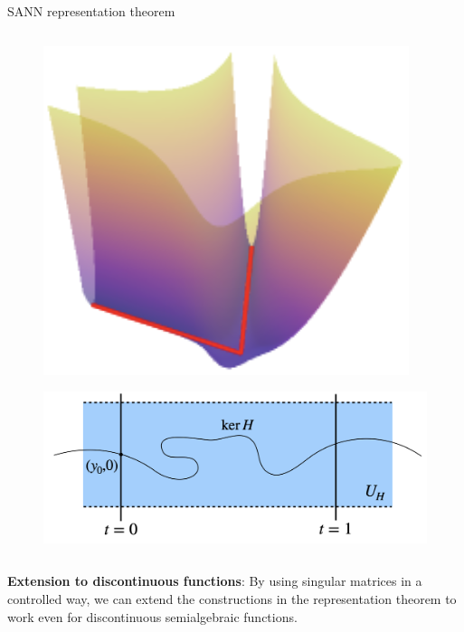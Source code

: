 \documentclass[final]{beamer}
\newlength{\lrcolwidth}
\begin{document}
\begin{frame}[t]
\begin{columns}[t]
\begin{column}{\lrcolwidth}
\begin{block}{SANN representation theorem}
\begin{columns}[t]
      \begin{column}{0.19\textwidth}
        \vspace{2cm}
        \begin{figure}[t!]
          \centering
          \vspace{-3cm}
          \includegraphics[width=0.9\linewidth]{images/ker_graph.png} 
        \end{figure}
        \vspace{4cm}
        \begin{figure}[t]
          \hspace*{-4cm} 
          \centering
          \includegraphics[width=1.5\linewidth]{images/krantz_and_parks_curve.png}        
        \end{figure}
      \end{column}
    \end{columns}
    \vspace{1cm}
    \textbf{Extension to discontinuous functions}:
    By using singular matrices in a controlled way, we can extend the constructions in the representation theorem to work even for discontinuous semialgebraic functions.
  \end{block}
\end{column}


\end{columns}
\end{frame}
\end{document}
